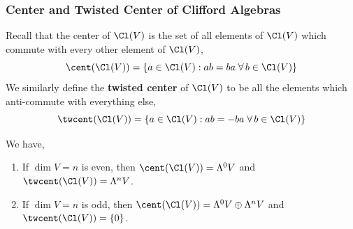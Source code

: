 \subsubsection{Center and Twisted Center of  Clifford Algebras}
\begin{defn}
Recall that the center of $\Cl(V)$ is the set of all elements of $\Cl(V)$ which commute with every other element of $\Cl(V)$,
\[\cent(\Cl(V)) = \{a \in \Cl(V) : ab = ba\;\forall\, b\in \Cl(V)\}\]
We similarly define the \textbf{twisted center} of $\Cl(V)$ to be all the elements which anti-commute with everything else,
\[\twcent(\Cl(V)) = \{a\in \Cl(V) : ab = -ba \;\forall\,b\in\Cl(V)\}\]
\end{defn}
\begin{thm}
We have,
\begin{enumerate}
    \item If $\dim V = n$ is even, then $\cent(\Cl(V)) = \Lambda^0 V$ and $\twcent(\Cl(V)) = \Lambda^n V$.
    \item If $\dim V = n$ is odd, then $\cent(\Cl(V)) = \Lambda^0 V \oplus \Lambda^n V$ and $\twcent(\Cl(V)) = \{0\}$.
\end{enumerate}
\end{thm}
